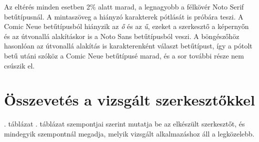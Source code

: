Az eltérés minden esetben 2\% alatt marad, a legnagyobb a félkövér Noto Serif betűtípusnál. A mintaszöveg a hiányzó karakterek pótlását is próbára teszi. A Comic Neue betűtípusból hiányzik az \textit{ő} és az \textit{ű}, ezeket a szerkesztő a képernyőn és az útvonallá alakításkor is a Noto Sans betűtípusból veszi. A böngészőhöz hasonlóan az útvonallá alakítás is karakterenként választ betűtípust, így a pótolt betű utáni szóköz a Comic Neue betűtípusé marad, és a sor további része nem csúszik el.

\section{Összevetés a vizsgált szerkesztőkkel}
\label{sec:comparison_result}

. táblázat . táblázat szempontjai szerint mutatja be az elkészült szerkesztőt, és mindegyik szempontnál megadja, melyik vizsgált alkalmazáshoz áll a legközelebb.

